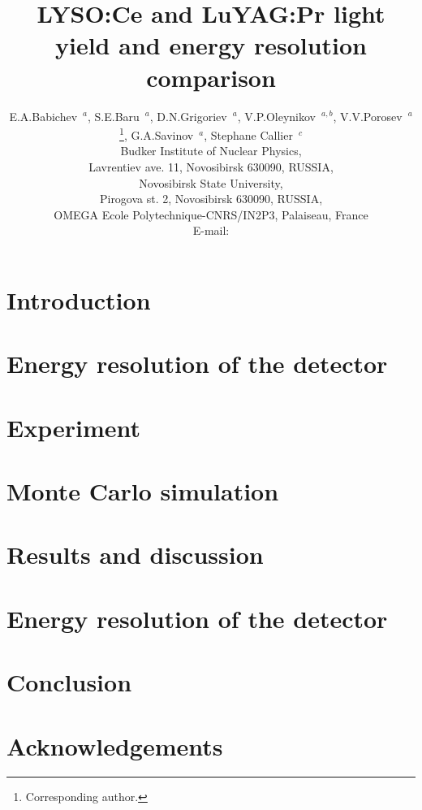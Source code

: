 \documentclass{JINST}
\title{LYSO:Ce and LuYAG:Pr light yield and energy resolution comparison}
\author{E.A.Babichev\ $^a$, S.E.Baru\ $^a$, D.N.Grigoriev\ $^a$, V.P.Oleynikov\ $^{a,b}$, V.V.Porosev\ $^a$\thanks{Corresponding author.}, G.A.Savinov\ $^a$, Stephane Callier\ $^c$
\\
\llap{$^a$}Budker Institute of Nuclear Physics, \\Lavrentiev ave. 11, Novosibirsk 630090, RUSSIA, \\
\llap{$^b$}Novosibirsk State University,\\ Pirogova st. 2, Novosibirsk 630090, RUSSIA,\\
\llap{$^c$}OMEGA Ecole Polytechnique-CNRS/IN2P3, Palaiseau, France\\


E-mail: \email{porosev@inp.nsk.su}}
\begin{document}
\section{Introduction}
\hspace*{\parindent} 



\section{Energy resolution of the detector}
\hspace*{\parindent}


\section{Experiment}
\hspace*{\parindent}

\section{Monte Carlo simulation}
\hspace*{\parindent}


\section{Results and discussion}
\hspace*{\parindent} 


\section{Energy resolution of the detector}
\hspace*{\parindent}



\section{Conclusion}
\hspace*{\parindent} 





\section{Acknowledgements}
\end{document}
